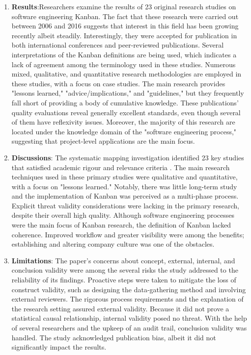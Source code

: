 \documentclass[conference]{IEEEtran}
\begin{document}
\begin{enumerate}
\item \textbf{Results}:Researchers examine the results of 23 original research studies on software engineering Kanban. The fact that these research were carried out between 2006 and 2016 suggests that interest in this field has been growing recently albeit steadily. Interestingly, they were accepted for publication in both international conferences and peer-reviewed publications. Several interpretations of the Kanban definitions are being used, which indicates a lack of agreement among the terminology used in these studies. Numerous mixed, qualitative, and quantitative research methodologies are employed in these studies, with a focus on case studies. The main research provides "lessons learned," "advice/implications," and "guidelines," but they frequently fall short of providing a body of cumulative knowledge. These publications' quality evaluations reveal generally excellent standards, even though several of them have reflexivity issues. Moreover, the majority of this research are located under the knowledge domain of the "software engineering process," suggesting that project-level applications are the main focus.

\item \textbf{Discussions}: The systematic mapping investigation identified 23 key studies that satisfied academic rigour and relevance criteria . The main research techniques used in these primary studies were qualitative and quantitative, with a focus on "lessons learned." Notably, there was little long-term study and the implementation of Kanban was perceived as a multi-phase process. Explicit threat validity considerations were lacking in the primary research, despite their overall high quality. Although software engineering processes were the main focus of Kanban research, the definition of Kanban lacked coherence. Improved workflow and greater visibility were among the benefits; establishing and altering company culture was one of the obstacles.
\item \textbf{Limitations}: The paper's concerns about concept, external, internal, and conclusion validity were among the several risks the study addressed to the reliability of its findings. Proactive steps were taken to mitigate the loss of construct validity, such as designing the data-gathering method and involving external reviewers. The rigorous process requirements and the explanation of the research setting assured external validity. Because it did not prove a statistical causal relationship, internal validity posed no threat. With the help of several researchers and the upkeep of an audit trail, conclusion validity was handled. The study acknowledged publication bias, albeit it did not significantly impact the results.


\end{enumerate}
\end{document}
